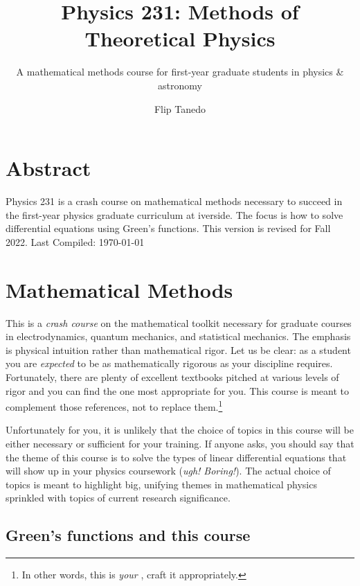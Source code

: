 \documentclass[
  11pt,
	colorful,
	raggedright,
]{tufte-style-thesis-flip}
\author{Flip Tanedo}
\title{Physics 231: Methods of Theoretical Physics}
\subtitle{A mathematical methods course for first-year graduate students in physics \& astronomy}
\begin{document}
\maketitle

\frontmatter

\chapter{Abstract}
Physics 231 is a crash course on mathematical methods necessary to succeed in the first-year physics graduate curriculum at iverside. 
%
The focus is how to solve differential equations using Green's functions. This version is revised for Fall 2022. Last Compiled: \today




\tableofcontents


\mainmatter

\chapter{Mathematical Methods}

This is a \emph{crash course} on the mathematical toolkit necessary for graduate courses in electrodynamics, quantum mechanics, and statistical mechanics. The emphasis is physical intuition rather than mathematical rigor. Let us be clear: as a student you are \emph{expected} to be as mathematically rigorous as your discipline requires. Fortunately, there are plenty of excellent textbooks pitched at various levels of rigor and you can find the one most appropriate for you. This course is meant to complement those references, not to replace them.\footnote{In other words, this is \emph{your} , craft it appropriately.}

Unfortunately for you, it is unlikely that the choice of topics in this course will be either necessary or sufficient for your training. If anyone asks, you should say that the theme of this course is to solve the types of linear differential equations that will show up in your physics coursework (\emph{ugh! Boring!}). The actual choice of topics is meant to highlight big, unifying themes in mathematical physics sprinkled with topics of current research significance.

\section{Green's functions and this course}
\end{document}
